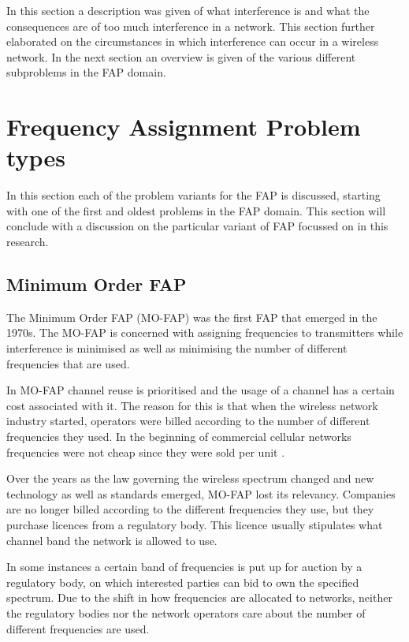 In this section a description was given of what interference is and what the consequences are of too much interference in a network. This section further elaborated on the circumstances in which interference can occur in a wireless network. In the next section an overview is given of the various different subproblems in the FAP domain.


\section{Frequency Assignment Problem types}
\label{sec:FAPVariants}
In this section each of the problem variants for the FAP is discussed, starting with one of the first and oldest problems in the FAP domain. This section will conclude with a discussion on the particular variant of FAP focussed on in this research.
\subsection{Minimum Order FAP}
The Minimum Order FAP (MO-FAP) was the first FAP that emerged in the 1970s. The MO-FAP is concerned with assigning frequencies to transmitters while interference is minimised as well as minimising the number of different frequencies that are used\cite{Karen2004}. 

In MO-FAP channel reuse is prioritised and the usage of a channel has a certain cost associated with it. The reason for this is that when the wireless network industry started, operators were billed according to the number of different frequencies they used. In the beginning of commercial cellular networks frequencies were not cheap since they were sold per unit \cite{MontemanniThesis}. 

Over the years as the law governing the wireless spectrum changed and new technology as well as standards emerged, MO-FAP lost its relevancy\cite{Karen2004,MontemanniThesis}. Companies are no longer billed according to the different frequencies they use, but they purchase licences from a regulatory body\cite{Karen2004,MontemanniThesis}. This licence usually stipulates what channel band the network is allowed to use.

In some instances a certain band of frequencies is put up for auction by a regulatory body, on which interested parties can bid to own the specified spectrum\cite{Karen2004,MontemanniThesis}. Due to the shift in how frequencies are allocated to networks, neither the regulatory bodies nor the network operators care about the number of different frequencies are used\cite{Karen2004,MontemanniThesis}.
